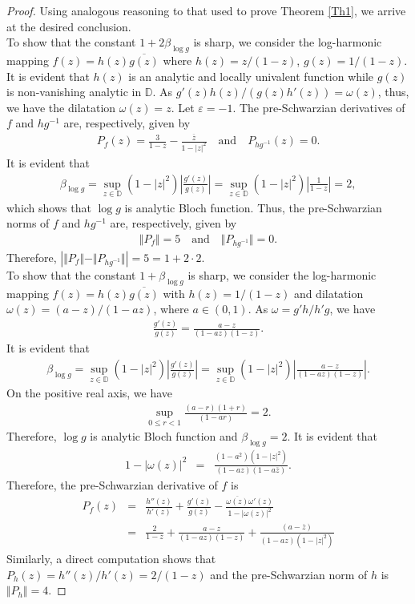 \documentclass[12pt,reqno]{amsart}
\newtheorem{open problem}{Open problem}[section]
\newcommand{\ol}{\overline}
\newcommand{\beas}{\begin{eqnarray*}}
\newcommand{\eeas}{\end{eqnarray*}}
\renewcommand{\epsilon}{\varepsilon}
\numberwithin{equation}{section}
\begin{document}
\begin{proof} Using analogous reasoning to that used to prove \textrm{Theorem} \ref{Th1}, we arrive at the desired conclusion.\\[2mm]
\indent To show that the constant $1+2\beta_{\log g}$ is sharp, we consider the log-harmonic mapping $f(z)=h(z)\overline{g(z)}$ where $h(z)=z/(1-z)$, $g(z)=1/(1-z)$. It is 
evident that $h(z)$ is an analytic and locally univalent function while $g(z)$ is non-vanishing analytic in $\mathbb{D}$. As $g'(z)h(z)/(g(z)h'(z))=\omega(z)$, thus, we have the 
dilatation $\omega(z)=z$. Let $\epsilon=-1$. The pre-Schwarzian derivatives of $f$ and $hg^{-1}$ are, respectively, given by 
\beas
P_f(z)=\frac{3}{1-z}-\frac{\overline{z}}{1-|z|^2}\quad\text{and}\quad P_{hg^{-1}}(z)=0.\eeas
It is evident that
\beas
\beta_{\log{g}}=\sup_{z\in\mathbb{D}}(1-|z|^2)\left|\frac{g'(z)}{g(z)}\right|=\sup_{z\in\mathbb{D}}(1-|z|^2)\left|\frac{1}{1-z}\right|=2,\eeas
which shows that $\log{g}$ is analytic Bloch function. Thus, the pre-Schwarzian norms of $f$ and $hg^{-1}$ are, respectively, given by 
\beas
\Vert P_f\Vert=5\quad\text{and}\quad \Vert P_{hg^{-1}}\Vert=0.\eeas
Therefore, $\left|\Vert P_f\Vert-\Vert P_{hg^{-1}}\Vert\right|=5=1+2\cdot2$.\\[2mm]
\indent To show that the constant $1+\beta_{\log g}$ is sharp, we consider the log-harmonic mapping $f(z)=h(z)\overline{g(z)}$ with $h(z)=1/(1-z)$ and dilatation $\omega(z)=(a-z)/(1-az)$, where $a\in(0,1)$. As $\omega=g'h/h'g$, we have 
\beas \frac{g'(z)}{g(z)}=\frac{a-z}{(1-az)(1-z)}.\eeas
It is evident that
\beas
\beta_{\log{g}}=\sup_{z\in\mathbb{D}}(1-|z|^2)\left|\frac{g'(z)}{g(z)}\right|=\sup_{z\in\mathbb{D}}(1-|z|^2)\left|\frac{a-z}{(1-az)(1-z)}\right|.\eeas
On the positive real axis, we have 
\beas \sup_{0\leq r<1}\frac{(a-r)(1+r)}{(1-ar)}=2.\eeas
Therefore, $\log{g}$ is analytic Bloch function and $\beta_{\log{g}}=2$. It is evident that 
\beas 1-|\omega(z)|^2&=&\frac{(1-a^2)(1-|z|^2)}{(1-az)(1-a\ol{z})}.\eeas
Therefore, the pre-Schwarzian derivative of $f$ is 
\beas P_f(z)&=&\frac{h''(z)}{h'(z)}+\frac{g'(z)}{g(z)}-\frac{\overline{\omega(z)}\omega'(z)}{1-|\omega(z)|^2}\\[2mm]
&=&\frac{2}{1-z}+\frac{a-z}{(1-az)(1-z)}+\frac{(a-\ol{z})}{(1-az)(1-|z|^2)}\eeas
Similarly, a direct computation shows that $P_h(z)=h''(z)/h'(z)=2/(1-z)$ and the pre-Schwarzian norm of $h$ is $\Vert P_h\Vert=4$. 

\end{proof}
\end{document}
